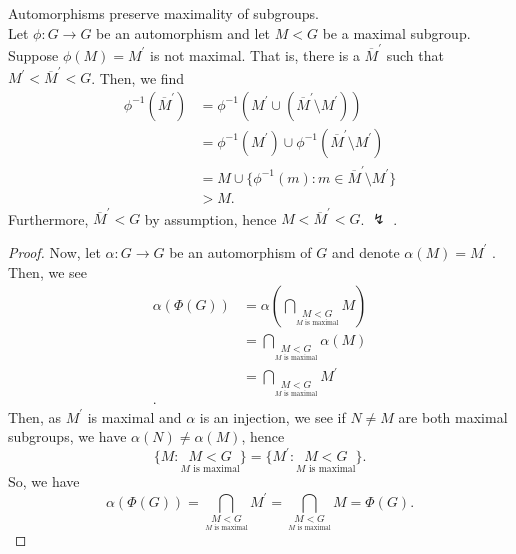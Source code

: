\documentclass[a4paper]{article}
\begin{document}
\begin{lemma}
	Automorphisms preserve maximality of subgroups.\\
	Let \(\phi :G \to G\)  be an automorphism and let \(M < G\)  be a maximal subgroup. Suppose \(\phi\left( M \right) = M^{\prime} \) is not maximal. That is, there is a \(\overline{M}^{\prime}\)  such that \(M^{\prime} < \overline{M}^{\prime} < G\). Then, we find
	\begin{align*}
		\phi ^{-1}\left( \overline{M}^{\prime} \right) &=  \phi ^{-1} \left( M^{\prime} \cup \left( \overline{M}^{\prime} \setminus M^{\prime} \right)\right)  \\
							       &= \phi ^{-1}\left( M^{\prime} \right) \cup \phi ^{-1}\left( \overline{M}^{\prime} \setminus M^{\prime}\right)  \\
							       &= M \cup \{\phi^{-1}\left( m \right) : m \in \overline{M}^{\prime} \setminus M^{\prime}\}  \\
							       &> M
	.\end{align*}
Furthermore, \(\overline{M}^{\prime} < G\)  by assumption, hence \(M < \overline{M}^{\prime} < G\). \(\lightning\) .
\end{lemma}
\begin{solution}[2]
	\begin{proof}
		Now, let \(\alpha: G \to G\)  be an automorphism of \(G\) and denote \(\alpha \left( M \right)  = M^{\prime}\) . Then, we see
\begin{align*}
\alpha \left( \Phi \left( G \right)  \right)  &= \alpha\left( \bigcap_{\underset{M \text{ is maximal}}{M < G}} M \right)  \\
						      &= \bigcap_{ \underset{ M \text{ is maximal}}{M < G}} \alpha \left( M \right)   \\
						      &= \bigcap_{\underset{M \text{ is maximal}}{M < G}} M^{\prime} \\
.\end{align*}
Then, as \(M^{\prime}\) is maximal and \(\alpha\) is an injection, we see if \(N \neq M\) are both maximal subgroups, we have \(\alpha \left( N \right)  \neq \alpha \left( M \right) \), hence \[\{ M :  \underset{ M \text{ is maximal}}{M < G}\}  = \{M^{\prime} :  \underset{ M \text{ is maximal}}{M < G}\} .\] So, we have \[
	\alpha\left( \Phi \left( G \right)  \right)  = \bigcap_{ \underset{ M \text{ is maximal}}{M < G}} M^{\prime} = \bigcap_{ \underset{ M \text{ is maximal}}{M < G}} M = \Phi\left( G \right)
.\]
\end{proof}
\end{solution}
\end{document}
